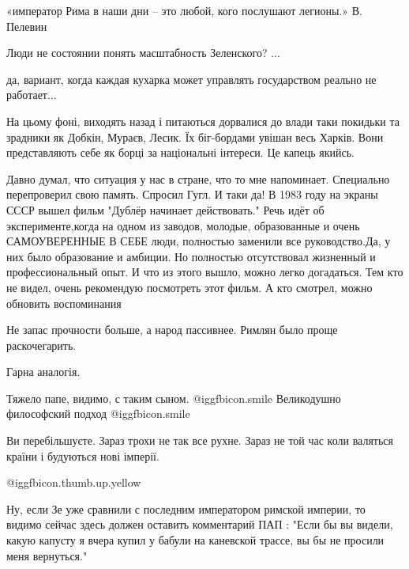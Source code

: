 \begin{itemize}
«император Рима в наши дни – это любой, кого послушают легионы.»
В. Пелевин

Люди не состоянии понять масштабность Зеленского? ...

да, вариант, когда каждая кухарка может управлять государством реально не работает...


На цьому фоні, виходять назад і питаються дорвалися до влади таки покидьки та
зрадники як Добкін, Мураєв, Лесик. Їх біг-бордами увішан весь Харків. Вони
представляють себе як борці за національні інтереси. Це капець якийсь.


Давно думал, что ситуация у нас в стране, что то мне напоминает. Специально
перепроверил свою память. Спросил Гугл. И таки да! В 1983 году на экраны СССР
вышел фильм "Дублёр начинает действовать." Речь идёт об эксперименте,когда на
одном из заводов, молодые, образованные и очень САМОУВЕРЕННЫЕ В СЕБЕ люди,
полностью заменили все руководство.Да, у них было образование и амбиции. Но
полностью отсутствовал жизненный и профессиональный опыт. И что из этого вышло,
можно легко догадаться. Тем кто не видел, очень рекомендую посмотреть этот
фильм. А кто смотрел, можно обновить воспоминания


Не запас прочности больше, а народ пассивнее. Римлян было проще раскочегарить.

Гарна аналогія.

Тяжело папе, видимо, с таким сыном.  @igg{fbicon.smile} 
Великодушно философский подход  @igg{fbicon.smile} 

Ви перебільшуєте. Зараз трохи не так все рухне. Зараз не той час коли валяться країни і будуються нові імперії.

 @igg{fbicon.thumb.up.yellow} 


Ну, если Зе уже сравнили с последним императором римской империи, то видимо
сейчас здесь должен оставить комментарий ПАП : "Если бы вы видели, какую
капусту я вчера купил у бабули на каневской трассе, вы бы не просили меня
вернуться."

\end{itemize} %
